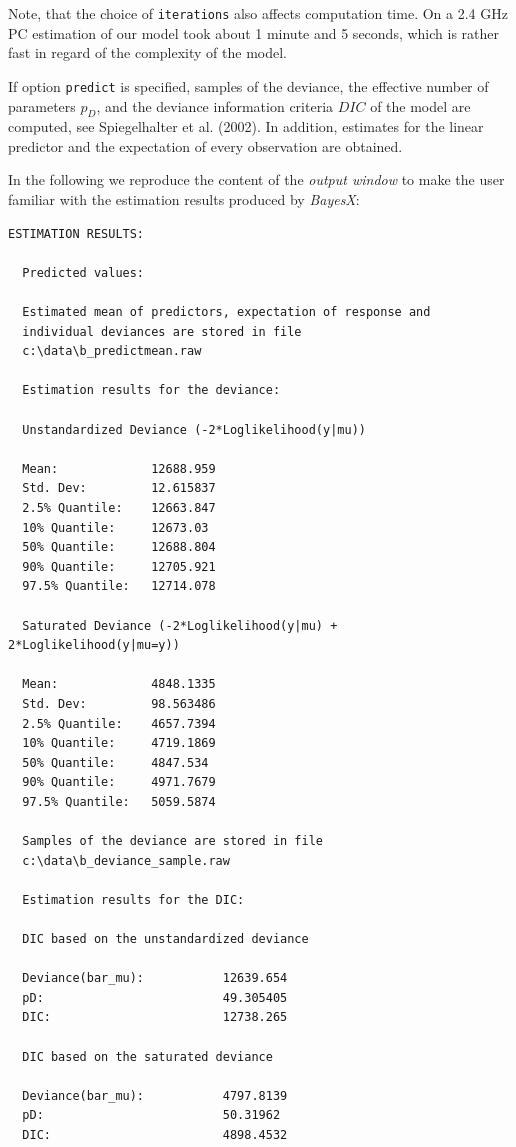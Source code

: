 \documentclass{article}
\begin{document}
Note, that the choice of {\tt iterations} also affects computation
time. On a 2.4 GHz PC estimation of our model took about 1 minute
and 5 seconds, which is rather fast in regard of the complexity of
the model.

If option {\tt predict} is specified, samples of the deviance, the
effective number of parameters $p_D$, and the deviance information
criteria $DIC$ of the model are computed, see Spiegelhalter et al.
(2002).\nocite{spibes02} In addition, estimates for the linear
predictor and the expectation of every observation are obtained.

In the following we reproduce the content of the {\em output
window} to make the user familiar with the estimation results
produced by {\em BayesX}:

\footnotesize
\begin{verbatim}
ESTIMATION RESULTS:

  Predicted values:

  Estimated mean of predictors, expectation of response and
  individual deviances are stored in file
  c:\data\b_predictmean.raw

  Estimation results for the deviance:

  Unstandardized Deviance (-2*Loglikelihood(y|mu))

  Mean:             12688.959
  Std. Dev:         12.615837
  2.5% Quantile:    12663.847
  10% Quantile:     12673.03
  50% Quantile:     12688.804
  90% Quantile:     12705.921
  97.5% Quantile:   12714.078

  Saturated Deviance (-2*Loglikelihood(y|mu) + 2*Loglikelihood(y|mu=y))

  Mean:             4848.1335
  Std. Dev:         98.563486
  2.5% Quantile:    4657.7394
  10% Quantile:     4719.1869
  50% Quantile:     4847.534
  90% Quantile:     4971.7679
  97.5% Quantile:   5059.5874

  Samples of the deviance are stored in file
  c:\data\b_deviance_sample.raw

  Estimation results for the DIC:

  DIC based on the unstandardized deviance

  Deviance(bar_mu):           12639.654
  pD:                         49.305405
  DIC:                        12738.265

  DIC based on the saturated deviance

  Deviance(bar_mu):           4797.8139
  pD:                         50.31962
  DIC:                        4898.4532


\end{verbatim}
\end{document}
